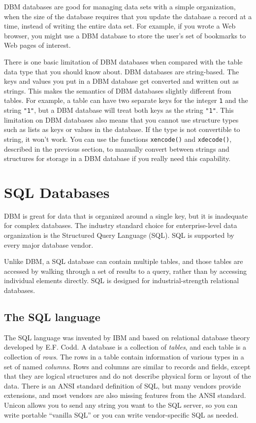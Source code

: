 DBM databases are good for managing data sets with a simple
organization, when the size of the database requires that you update
the database a record at a time, instead of writing the entire data
set. For example, if you wrote a Web browser, you might use a DBM
database to store the user's set of bookmarks to Web
pages of interest.

There is one basic limitation of DBM databases when compared with the
table data type that you should know about. DBM databases are
string-based. The keys and values you put in a DBM database get
converted and written out as strings. This makes the semantics of DBM
databases slightly different from tables. For example, a table can have
two separate keys for the integer \texttt{1} and the string
\texttt{"1"}, but a DBM database will treat
both keys as the string \texttt{"1"}. This
limitation on DBM databases also means that you cannot use structure
types such as lists as keys or values in the database. If the type is
not convertible to string, it won't work. You can use
the functions \texttt{xencode()} and \texttt{xdecode()}, described in
the previous section, to manually convert between strings and
structures for storage in a DBM database if you really need this
capability.

\section[SQL Databases]{SQL Databases}

DBM is great for data that is organized around a single
key, but it is inadequate for complex databases. The industry
standard choice for enterprise-level data organization is the
Structured Query Language (SQL). SQL is supported by every major
database vendor.

Unlike DBM, a SQL database can contain
multiple tables, and those tables are accessed by walking through a set
of results to a query, rather than by accessing individual elements
directly. SQL is designed for industrial-strength relational databases.

\subsection*{The SQL language}

The SQL language was invented by IBM and based on relational database
theory developed by E.F. Codd. A database is a collection of
\textit{tables}, and each table is a collection of \textit{rows}. The
rows in a table contain information of various types in a set of named
\textit{columns}. Rows and columns are similar to records and fields,
except that they are logical structures and do not describe physical
form or layout of the data. There is an ANSI standard definition of
SQL, but many vendors provide extensions, and most vendors are also
missing features from the ANSI standard. Unicon allows you to send any
string you want to the SQL server, so you can write portable
``vanilla SQL'' or you can write vendor-specific SQL as needed.

